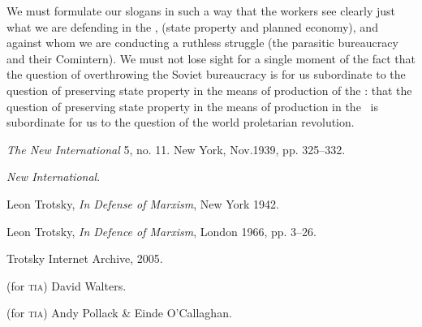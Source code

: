 We must formulate our slogans in such a way that the workers see clearly just what we are defending in the \USSR, (state property and planned economy), and against whom we are conducting a ruthless struggle (the parasitic bureaucracy and their Comintern). We must not lose sight for a single moment of the fact that the question of overthrowing the Soviet bureaucracy is for us subordinate to the question of preserving state property in the means of production of the \USSR: that the question of preserving state property in the means of production in the \USSR\ is subordinate for us to the question of the world proletarian revolution.


\begin{letterinfo}
   \emph{The New International} 5, no. 11. New York, Nov.\@ 1939, pp. 325--332.
	
   \emph{New International}.
	
   Leon Trotsky, \emph{In Defense of Marxism}, New York 1942.
	
   Leon Trotsky, \emph{In Defence of Marxism}, London 1966, pp. 3--26.
	
   Trotsky Internet Archive, 2005.
	
   (for \textsc{tia}) David Walters.
	
   (for \textsc{tia}) Andy Pollack \& Einde O’Callaghan.
\end{letterinfo}
